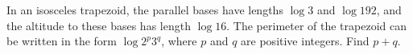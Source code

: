 In an isosceles trapezoid, the parallel bases have lengths $\log3$ and $\log192$,  and the altitude to these bases has length $\log16$. The perimeter of the trapezoid can be written in the form $\log2^p3^q$,  where $p$ and $q$ are positive integers. Find $p+q$.